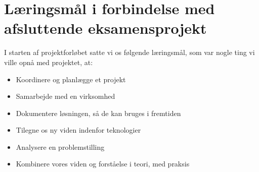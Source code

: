 \section{Læringsmål i forbindelse med afsluttende eksamensprojekt}
I starten af projektforløbet satte vi os følgende læringsmål, som var nogle ting vi ville opnå med projektet, at:
\begin{itemize}
    \item{Koordinere og planlægge et projekt}
    \item{Samarbejde med en virksomhed}
    \item{Dokumentere løsningen, så de kan bruges i fremtiden}
    \item{Tilegne os ny viden indenfor teknologier}
    \item{Analysere en problemstilling}
    \item{Kombinere vores viden og forståelse i teori, med praksis}
\end{itemize}
